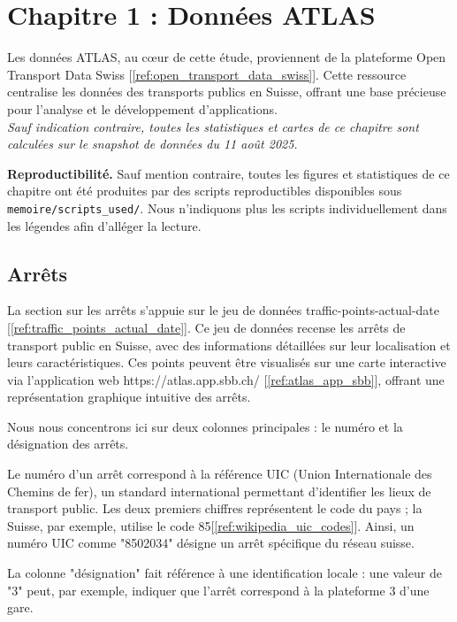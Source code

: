 \chapter{Chapitre 1 : Données ATLAS}

Les données ATLAS, au cœur de cette étude, proviennent de la plateforme Open Transport Data Swiss [\ref{ref:open_transport_data_swiss}]. Cette ressource centralise les données des transports publics en Suisse, offrant une base précieuse pour l’analyse et le développement d’applications.\\
\textit{Sauf indication contraire, toutes les statistiques et cartes de ce chapitre sont calculées sur le snapshot de données du 11 août 2025.}

\medskip
\noindent\textbf{Reproductibilité.} Sauf mention contraire, toutes les figures et statistiques de ce chapitre ont été produites par des scripts reproductibles disponibles sous \texttt{memoire/scripts\_used/}. Nous n’indiquons plus les scripts individuellement dans les légendes afin d’alléger la lecture.

\section{Arrêts}

La section sur les arrêts s’appuie sur le jeu de données traffic-points-actual-date [\ref{ref:traffic_points_actual_date}]. Ce jeu de données recense les arrêts de transport public en Suisse, avec des informations détaillées sur leur localisation et leurs caractéristiques. Ces points peuvent être visualisés sur une carte interactive via l’application web https://atlas.app.sbb.ch/ [\ref{ref:atlas_app_sbb}], offrant une représentation graphique intuitive des arrêts.

Nous nous concentrons ici sur deux colonnes principales : le numéro et la désignation des arrêts.

Le numéro d’un arrêt correspond à la référence UIC (Union Internationale des Chemins de fer), un standard international permettant d’identifier les lieux de transport public. Les deux premiers chiffres représentent le code du pays ; la Suisse, par exemple, utilise le code 85[\ref{ref:wikipedia_uic_codes}]. Ainsi, un numéro UIC comme "8502034" désigne un arrêt spécifique du réseau suisse.

La colonne "désignation" fait référence à une identification locale : une valeur de "3" peut, par exemple, indiquer que l’arrêt correspond à la plateforme 3 d’une gare.

